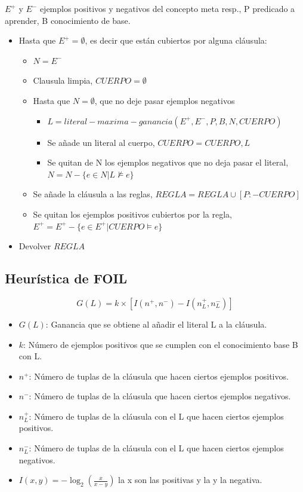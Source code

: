 \documentclass[12pt, twoside, openright]{report} %
\begin{document}
$E^+$ y $E^-$ ejemplos positivos y negativos del concepto meta resp., P predicado a aprender, B conocimiento de base.
\begin{itemize}
	\item Hasta que $E^+ = \emptyset$, es decir que están cubiertos por alguna cláusula:
	      \begin{itemize}
		      \item $N = E^-$
		      \item Clausula limpia, $CUERPO = \emptyset$
		      \item Hasta que $N = \emptyset$, que no deje pasar ejemplos negativos
		            \begin{itemize}
			            \item $L = literal-maxima-ganancia(E^+, E^-, P, B, N, CUERPO)$
			            \item Se añade un literal al cuerpo, $CUERPO = CUERPO, L$
			            \item Se quitan de N los ejemplos negativos que no deja pasar el literal, $N = N - \{e \in N | L \nvDash e\}$
		            \end{itemize}
		      \item Se añade la cláusula a las reglas, $REGLA = REGLA \cup [P:-CUERPO]$
		      \item Se quitan los ejemplos positivos cubiertos por la regla, $E^+ = E^+ - \{e \in E^+ | CUERPO \vDash e\}$
	      \end{itemize}
	\item Devolver $REGLA$
\end{itemize}
\pagebreak
\subsection{Heurística de FOIL}
$$G(L)=k\times [I(n^+,n^-)-I(n^+_L, n^-_L)]$$
\begin{itemize}
	\item $G(L)$: Ganancia que se obtiene al añadir el literal L a la cláusula.
	\item $k$: Número de ejemplos positivos que se cumplen con el conocimiento base B con L.
	\item $n^+$: Número de tuplas de la cláusula que hacen ciertos ejemplos positivos.
	\item $n^-$: Número de tuplas de la cláusula que hacen ciertos ejemplos negativos.
	\item $n^+_L$: Número de tuplas de la cláusula con el L que hacen ciertos ejemplos positivos.
	\item $n^-_L$: Número de tuplas de la cláusula con el L que hacen ciertos ejemplos negativos.
	\item $I(x, y)=-\log_2 \left( \frac{x}{x-y} \right)$ la x son las positivas y la y la negativa.
\end{itemize}
\end{document}

